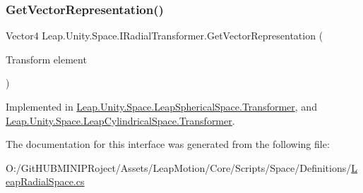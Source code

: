 \subsubsection{\texorpdfstring{GetVectorRepresentation()}{GetVectorRepresentation()}}
{\footnotesize\ttfamily Vector4 Leap.\+Unity.\+Space.\+I\+Radial\+Transformer.\+Get\+Vector\+Representation (\begin{DoxyParamCaption}\item[{Transform}]{element }\end{DoxyParamCaption})}



Implemented in \mbox{\hyperlink{class_leap_1_1_unity_1_1_space_1_1_leap_spherical_space_1_1_transformer_ab2e6a163514c332db4c662754f37f385}{Leap.\+Unity.\+Space.\+Leap\+Spherical\+Space.\+Transformer}}, and \mbox{\hyperlink{class_leap_1_1_unity_1_1_space_1_1_leap_cylindrical_space_1_1_transformer_a7229a4bf75a299edb189790eeadd9341}{Leap.\+Unity.\+Space.\+Leap\+Cylindrical\+Space.\+Transformer}}.



The documentation for this interface was generated from the following file\+:\begin{DoxyCompactItemize}
\item 
O\+:/\+Git\+H\+U\+B\+M\+I\+N\+I\+P\+Roject/\+Assets/\+Leap\+Motion/\+Core/\+Scripts/\+Space/\+Definitions/\mbox{\hyperlink{_leap_radial_space_8cs}{Leap\+Radial\+Space.\+cs}}\end{DoxyCompactItemize}
